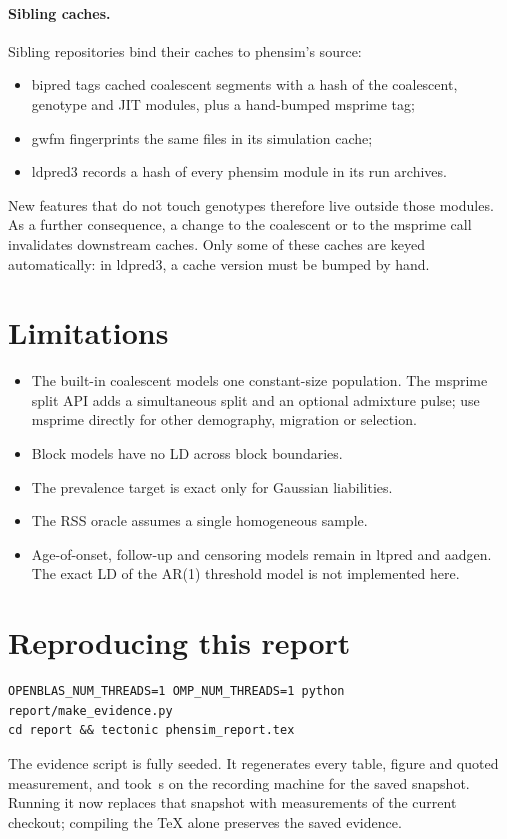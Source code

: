 \documentclass[11pt,a4paper]{article}
\begin{document}
\paragraph{Sibling caches.}
Sibling repositories bind their caches to phensim's source:
\begin{itemize}
\item bipred tags cached coalescent segments with a hash of the coalescent,
  genotype and JIT modules, plus a hand-bumped msprime tag;
\item gwfm fingerprints the same files in its simulation cache;
\item ldpred3 records a hash of every phensim module in its run archives.
\end{itemize}
New features that do not touch genotypes therefore live outside those
modules. As a further consequence, a change to the coalescent or to the
msprime call invalidates downstream caches. Only some of these caches are
keyed automatically: in ldpred3, a cache version must be bumped by hand.

\section{Limitations}
\begin{itemize}
\item The built-in coalescent models one constant-size population.
  The msprime split API adds a simultaneous split and an optional admixture
  pulse; use msprime directly for other demography, migration or selection.
\item Block models have no LD across block boundaries.
\item The prevalence target is exact only for Gaussian liabilities.
\item The RSS oracle assumes a single homogeneous sample.
\item Age-of-onset, follow-up and censoring models remain in ltpred and
  aadgen. The exact LD of the AR(1) threshold model is not implemented here.
\end{itemize}

\section*{Reproducing this report}
\begin{verbatim}
OPENBLAS_NUM_THREADS=1 OMP_NUM_THREADS=1 python report/make_evidence.py
cd report && tectonic phensim_report.tex
\end{verbatim}
The evidence script is fully seeded. It regenerates every table, figure and
quoted measurement, and took \PhSeconds\,s on the recording machine for the
saved snapshot. Running it now replaces that snapshot with measurements of
the current checkout; compiling the TeX alone preserves the saved evidence.
\end{document}
